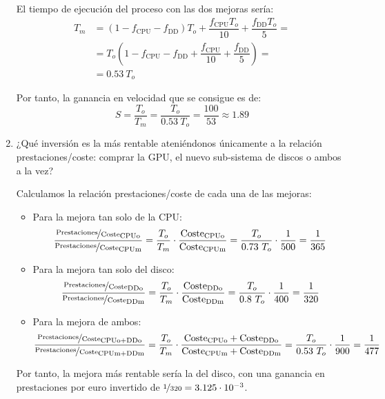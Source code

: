 \begin{enumerate}
    El tiempo de ejecución del proceso con las dos mejoras sería:
    \begin{align*}
        T_m &= (1-f_{\text{CPU}}-f_{\text{DD}})T_o + \dfrac{f_{\text{CPU}}T_o}{10} + \dfrac{f_{\text{DD}}T_o}{5}
        =\\&= T_o\left(1-f_{\text{CPU}}-f_{\text{DD}}+\dfrac{f_{\text{CPU}}}{10}+\dfrac{f_{\text{DD}}}{5}\right)
        =\\&= 0.53\ T_o
    \end{align*}

    Por tanto, la ganancia en velocidad que se consigue es de:
    \begin{equation*}
        S = \dfrac{T_o}{T_m} = \dfrac{T_o}{0.53\ T_o} = \dfrac{100}{53} \approx 1.89
    \end{equation*}
    
    \item ¿Qué inversión es la más rentable ateniéndonos únicamente a la relación prestaciones/coste: comprar la GPU, el nuevo sub-sistema de discos o ambos a la vez?
    
    Calculamos la relación prestaciones/coste de cada una de las mejoras:
    \begin{itemize}
        \item Para la mejora tan solo de la CPU:
        \begin{equation*}
            \dfrac{\nicefrac{\text{Prestaciones}}{\text{Coste}}_{\text{CPUo}}}{\nicefrac{\text{Prestaciones}}{\text{Coste}}_{\text{CPUm}}} = \dfrac{T_o}{T_m}\cdot \dfrac{\text{Coste}_{\text{CPUo}}}{\text{Coste}_{\text{CPUm}}}
            = \dfrac{T_o}{0.73\ T_o}\cdot \dfrac{1}{500} = \dfrac{1}{365}
        \end{equation*}

        \item Para la mejora tan solo del disco:
        \begin{equation*}
            \dfrac{\nicefrac{\text{Prestaciones}}{\text{Coste}}_{\text{DDo}}}{\nicefrac{\text{Prestaciones}}{\text{Coste}}_{\text{DDm}}} = \dfrac{T_o}{T_m}\cdot \dfrac{\text{Coste}_{\text{DDo}}}{\text{Coste}_{\text{DDm}}}
            = \dfrac{T_o}{0.8\ T_o}\cdot \dfrac{1}{400} = \dfrac{1}{320}
        \end{equation*}

        \item Para la mejora de ambos:
        \begin{equation*}
            \dfrac{\nicefrac{\text{Prestaciones}}{\text{Coste}}_{\text{CPUo}+\text{DDo}}}{\nicefrac{\text{Prestaciones}}{\text{Coste}}_{\text{CPUm}+\text{DDm}}} = \dfrac{T_o}{T_m}\cdot \dfrac{\text{Coste}_{\text{CPUo}}+\text{Coste}_{\text{DDo}}}{\text{Coste}_{\text{CPUm}}+\text{Coste}_{\text{DDm}}}
            = \dfrac{T_o}{0.53\ T_o}\cdot \dfrac{1}{900} = \dfrac{1}{477}
        \end{equation*}
    \end{itemize}

    Por tanto, la mejora más rentable sería la del disco, con una ganancia en prestaciones por euro invertido de $\nicefrac{1}{320}=3.125\cdot 10^{-3}$.
\end{enumerate}

